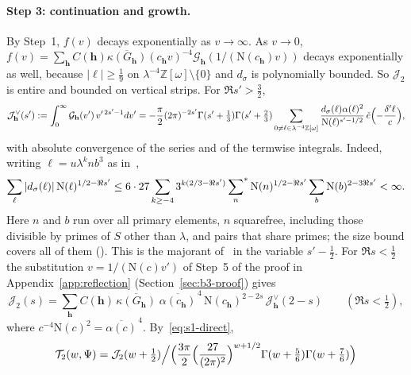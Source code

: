 \documentclass[11pt]{article}
\numberwithin{equation}{section}
\newcommand{\OO}{\mathbb Z[\omega]}
\newcommand{\N}{\mathrm N}
\newcommand{\ce}{\check e}
\newcommand{\ssum}{\sideset{}{^*}\sum}
\begin{document}
\paragraph{Step 3: continuation and growth.} By Step~1, $f(v)$ decays exponentially as $v\to\infty$. As $v\to0$,
$f(v)=\sum_{\mathbf h}C(\mathbf h)\overline{\kappa(G_{\mathbf h})}(c_{\mathbf h}v)^{-4}
\mathcal G_{\mathbf h}(1/(\N(c_{\mathbf h})v))$ decays exponentially as well, because $|\ell|\ge\frac19$ on
$\lambda^{-4}\OO\setminus\{0\}$ and $d_\sigma$ is polynomially bounded. So $\mathcal J_2$ is entire and bounded on vertical
strips. For $\Re s'>\frac32$,
\begin{equation}\label{eq:s1-dual}
 \mathcal J^\vee_{\mathbf h}(s'):=\int_0^\infty\mathcal G_{\mathbf h}(v')\,v'^{\,2s'-1}dv'
 =-\frac\pi2(2\pi)^{-2s'}\Gamma(s'+\tfrac13)\Gamma(s'+\tfrac23)
 \sum_{0\ne\ell\in\lambda^{-4}\OO}\frac{d_\sigma(\ell)\alpha(\ell)^2}{\N(\ell)^{s'-1/2}}\,\ce\Bigl(-\frac{\delta'\ell}c\Bigr),
\end{equation}
with absolute convergence of the series and of the termwise integrals. Indeed, writing $\ell=u\lambda^knb^3$ as
in~\cite[eq.~(5.2)]{OAI78},
\begin{equation}\label{eq:d132}
 \sum_\ell|d_\sigma(\ell)|\,\N(\ell)^{1/2-\Re s'}\le6\cdot27\sum_{k\ge-4}3^{k(2/3-\Re s')}
 \ssum_n\N(n)^{1/2-\Re s'}\sum_b\N(b)^{2-3\Re s'}<\infty .
\end{equation}
Here $n$ and $b$ run over all primary elements, $n$ squarefree, including those divisible by primes of $S$ other than
$\lambda$, and pairs that share primes; the size bound covers all of them (\cite[Proposition~5.1; proof of Proposition~5.1, \emph{The fixed theta input}]{OAI78}). This is the majorant
of~\cite[proof of Proposition~5.1, \emph{Mellin normalization and continuation}]{OAI78} in the variable $s'-\frac12$. For $\Re s<\frac12$ the substitution $v=1/(\N(c)v')$ of
Step~5 of the proof in Appendix~\ref{app:reflection} (Section~\ref{sec:b3-proof}) gives
\begin{equation}\label{eq:s1-fe}
 \mathcal J_2(s)=\sum_{\mathbf h}C(\mathbf h)\,\overline{\kappa(G_{\mathbf h})}\;
 \overline{\alpha(c_{\mathbf h})}^{\,4}\,\N(c_{\mathbf h})^{2-2s}\,\mathcal J^\vee_{\mathbf h}(2-s)
 \qquad(\Re s<\tfrac12),
\end{equation}
where $c^{-4}\N(c)^2=\overline{\alpha(c)}^{\,4}$. By~\eqref{eq:s1-direct},
\begin{equation}\label{eq:d133}
 \mathcal T_2(w,\Psi)=\mathcal J_2(w+\tfrac12)\Big/\Bigl(\frac{3\pi}2\Bigl(\frac{27}{(2\pi)^2}\Bigr)^{w+1/2}
 \Gamma(w+\tfrac56)\Gamma(w+\tfrac76)\Bigr)
\end{equation}
\end{document}
